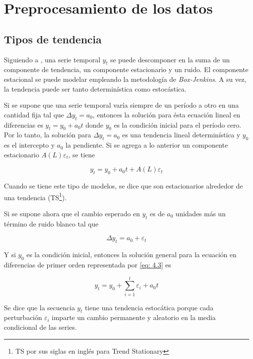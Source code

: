 \chapter{Preprocesamiento de los datos}
\label{chap:preprocessing}
\section{Tipos de tendencia}
\label{sec:trend_types}


Siguiendo a \cite{enders}, una serie temporal $y_t$ se puede descomponer en la suma de un componente de tendencia, un componente estacionario y un ruido. El componente estacional se puede modelar empleando la metodología de \textit{Box-Jenkins}. A su vez, la tendencia puede ser tanto determinística como estocástica.

Si se supone que una serie temporal varía siempre de un período a otro en una cantidad fija  tal que  $\Delta y_t=a_0$, entonces la solución para ésta ecuación lineal en diferencias es $y_t=y_0 + a_0t$ donde $y_0$ es la condición inicial para el período cero. Por lo tanto, la solución para $\Delta y_t=a_0$ es una tendencia lineal determinística y $y_0$ es el intercepto y $a_0$ la pendiente. Si se agrega a lo anterior un componente estacionario $A(L)\varepsilon_t$, se tiene

\begin{equation}
\label{eq: 4.2}
y_t=y_0 + a_0 t + A(L)\varepsilon_t
\end{equation}

Cuando se tiene este tipo de modelos, se dice que son estacionarios alrededor de una tendencia (TS\footnote{TS por sus siglas en inglés para Trend Stationary}).

Si se supone ahora que el cambio esperado en $y_t$ es de $a_0$ unidades más un término de ruido blanco tal que 


\begin{equation}
\label{eq: 4.3}
\Delta y_t= a_0 + \varepsilon_t
\end{equation}

Y si $y_0$ es la condición inicial, entonces la solución general para la ecuación en diferencias de primer orden representada por \eqref{eq: 4.3} es

$$
y_t=y_0 +\sum_{i=1}^t \varepsilon_i + a_0 t
$$

Se dice que la secuencia $y_t$ tiene una tendencia estocática porque cada perturbación $\varepsilon_i$ imparte un cambio permanente y aleatorio en la media condicional de las series. 

